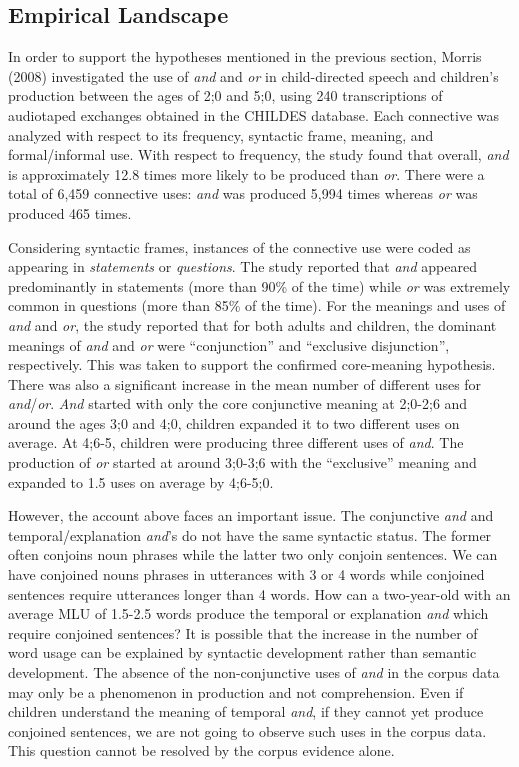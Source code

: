 \documentclass[oneside]{report}
\theoremstyle{definition}
\theoremstyle{definition}
\theoremstyle{definition}
\theoremstyle{remark}
\begin{document}
\subsection{Empirical Landscape}\label{empirical-landscape-1}

In order to support the hypotheses mentioned in the previous section,
Morris (2008) investigated the use of \emph{and} and \emph{or} in
child-directed speech and children's production between the ages of 2;0
and 5;0, using 240 transcriptions of audiotaped exchanges obtained in
the CHILDES database. Each connective was analyzed with respect to its
frequency, syntactic frame, meaning, and formal/informal use. With
respect to frequency, the study found that overall, \emph{and} is
approximately 12.8 times more likely to be produced than \emph{or}.
There were a total of 6,459 connective uses: \emph{and} was produced
5,994 times whereas \emph{or} was produced 465 times.

Considering syntactic frames, instances of the connective use were coded
as appearing in \emph{statements} or \emph{questions}. The study
reported that \emph{and} appeared predominantly in statements (more than
90\% of the time) while \emph{or} was extremely common in questions
(more than 85\% of the time). For the meanings and uses of \emph{and}
and \emph{or}, the study reported that for both adults and children, the
dominant meanings of \emph{and} and \emph{or} were ``conjunction'' and
``exclusive disjunction'', respectively. This was taken to support the
confirmed core-meaning hypothesis. There was also a significant increase
in the mean number of different uses for \emph{and}/\emph{or}.
\emph{And} started with only the core conjunctive meaning at 2;0-2;6 and
around the ages 3;0 and 4;0, children expanded it to two different uses
on average. At 4;6-5, children were producing three different uses of
\emph{and}. The production of \emph{or} started at around 3;0-3;6 with
the ``exclusive'' meaning and expanded to 1.5 uses on average by
4;6-5;0.

However, the account above faces an important issue. The conjunctive
\emph{and} and temporal/explanation \emph{and}'s do not have the same
syntactic status. The former often conjoins noun phrases while the
latter two only conjoin sentences. We can have conjoined nouns phrases
in utterances with 3 or 4 words while conjoined sentences require
utterances longer than 4 words. How can a two-year-old with an average
MLU of 1.5-2.5 words produce the temporal or explanation \emph{and}
which require conjoined sentences? It is possible that the increase in
the number of word usage can be explained by syntactic development
rather than semantic development. The absence of the non-conjunctive
uses of \emph{and} in the corpus data may only be a phenomenon in
production and not comprehension. Even if children understand the
meaning of temporal \emph{and}, if they cannot yet produce conjoined
sentences, we are not going to observe such uses in the corpus data.
This question cannot be resolved by the corpus evidence alone.
\end{document}

